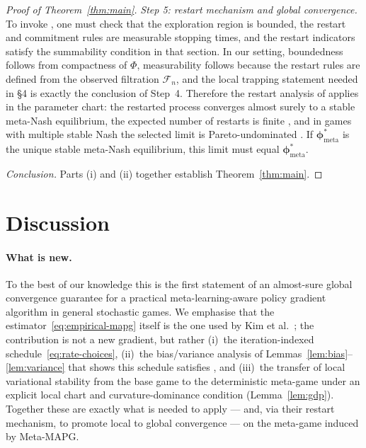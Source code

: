 \documentclass[11pt]{article}
\theoremstyle{definition}
\newcommand{\calF}{\mathcal{F}}
\newcommand{\meta}{\mathrm{meta}}
\begin{document}
\begin{proof}[Proof of Theorem~\ref{thm:main}]
\emph{Step 5: restart mechanism and global convergence.} To invoke \cite[§4]{Giannou2022}, one must check that the exploration region is bounded, the restart and commitment rules are measurable stopping times, and the restart indicators satisfy the summability condition in that section. In our setting, boundedness follows from compactness of $\Phi$, measurability follows because the restart rules are defined from the observed filtration $\calF_n$, and the local trapping statement needed in §4 is exactly the conclusion of Step~4. Therefore the restart analysis of \cite[§4]{Giannou2022} applies in the parameter chart: the restarted process converges almost surely to a stable meta-Nash equilibrium, the expected number of restarts is finite \cite[Prop.~4.1]{Giannou2022}, and in games with multiple stable Nash the selected limit is Pareto-undominated \cite[Prop.~4.3]{Giannou2022}. If $\bm\phi^*_\meta$ is the unique stable meta-Nash equilibrium, this limit must equal $\bm\phi^*_\meta$.

\emph{Conclusion.} Parts (i) and (ii) together establish Theorem~\ref{thm:main}.
\end{proof}

\section{Discussion}

\paragraph{What is new.} To the best of our knowledge this is the first statement of an almost-sure global convergence guarantee for a practical meta-learning-aware policy gradient algorithm in general stochastic games. We emphasise that the estimator~\eqref{eq:empirical-mapg} itself is the one used by Kim et al.~\cite{Kim2021}; the contribution is not a new gradient, but rather (i)~the iteration-indexed schedule~\eqref{eq:rate-choices}, (ii)~the bias/variance analysis of Lemmas~\ref{lem:bias}--\ref{lem:variance} that shows this schedule satisfies \cite[Eq.~(2.10)]{Giannou2022}, and (iii)~the transfer of local variational stability from the base game to the deterministic meta-game under an explicit local chart and curvature-dominance condition (Lemma~\ref{lem:gdp}). Together these are exactly what is needed to apply \cite[Theorem~1]{Giannou2022} --- and, via their restart mechanism, to promote local to global convergence --- on the meta-game induced by Meta-MAPG.
\end{document}
